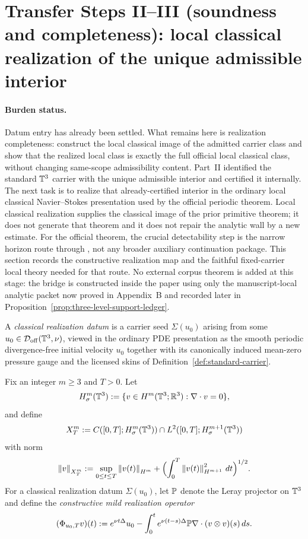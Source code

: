 \section{Transfer Steps II--III (soundness and completeness): local classical realization of the unique admissible interior}\label{sec:data-extraction-realization}
\paragraph{Burden status.}
Datum entry has already been settled. What remains here is realization completeness: construct the local classical image of the admitted carrier class and show that the realized local class is exactly the full official local classical class, without changing same-scope admissibility content.
Part~II identified the standard $\mathbb{T}^3$ carrier with the unique admissible interior and certified it internally. The next task is to realize that already-certified interior in the ordinary local classical Navier--Stokes presentation used by the official periodic theorem. Local classical realization supplies the classical image of the prior primitive theorem; it does not generate that theorem and it does not repair the analytic wall by a new estimate. For the official theorem, the crucial detectability step is the narrow horizon route through \HorizonDetectabilityRef{}, not any broader auxiliary continuation package. This section records the constructive realization map and the faithful fixed-carrier local theory needed for that route.
No external corpus theorem is added at this stage: the bridge is constructed inside the paper using only the manuscript-local analytic packet now proved in Appendix~B and recorded later in Proposition~\ref{prop:three-level-support-ledger}.

\begin{definition}\label{def:classical-realization-datum}
A \emph{classical realization datum} is a carrier seed $\Sigma(u_0)$ arising from some
$u_0\in\mathcal D_{\mathrm{off}}(\mathbb{T}^3,\nu)$, viewed in the ordinary PDE presentation as the smooth
periodic divergence-free initial velocity $u_0$ together with its canonically induced mean-zero
pressure gauge and the licensed skins of Definition~\ref{def:standard-carrier}.
\end{definition}

\begin{definition}\label{def:mild-realization-operator}
Fix an integer $m\ge 3$ and $T>0$. Let
\[
H^m_\sigma(\mathbb{T}^3):=\{v\in H^m(\mathbb{T}^3;\mathbb{R}^3):\nabla\cdot v=0\},
\]
and define
\[
X_T^m:=C([0,T];H^m_\sigma(\mathbb{T}^3))\cap L^2([0,T];H^{m+1}_\sigma(\mathbb{T}^3))
\]
with norm
\[
\left\lVert v\right\rVert_{X_T^m}:=\sup_{0\le t\le T}\left\lVert v(t)\right\rVert_{H^m}
+\Bigl(\int_0^T \left\lVert v(t)\right\rVert_{H^{m+1}}^2\,dt\Bigr)^{1/2}.
\]
For a classical realization datum $\Sigma(u_0)$, let $\mathbb{P}$ denote the Leray projector on
$\mathbb{T}^3$ and define the \emph{constructive mild realization operator}
\[
(\Phi_{u_0,T}v)(t)
:= e^{\nu t\Delta}u_0
-\int_0^t e^{\nu (t-s)\Delta}\mathbb{P}\nabla\cdot(v\otimes v)(s)\,ds.
\]
\end{definition}

